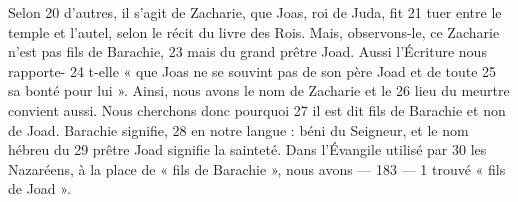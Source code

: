 Selon	 
20	 	d'autres, il s'agit de Zacharie, que Joas, roi de Juda, fit	 
21	 	tuer entre le temple et l'autel, selon le récit du livre des Rois.
Mais, observons-le, ce Zacharie n'est pas fils de Barachie,	 
23	 	mais du grand prêtre Joad. Aussi l'Écriture nous rapporte-	 
24	 	t-elle « que Joas ne se souvint pas de son père Joad et de toute	 
25	 	sa bonté pour lui ». Ainsi, nous avons le nom de Zacharie et le	 
26	 	lieu du meurtre convient aussi. Nous cherchons donc pourquoi	 
27	 	il est dit fils de Barachie et non de Joad. Barachie signifie,	 
28	 	en notre langue : béni du Seigneur, et le nom hébreu du	 
29	 	prêtre Joad signifie la sainteté. Dans l'Évangile utilisé par	 
30	 	les Nazaréens, à la place de « fils de Barachie », nous avons	 
 	--- 183 ---	 
1	 	trouvé « fils de Joad ».